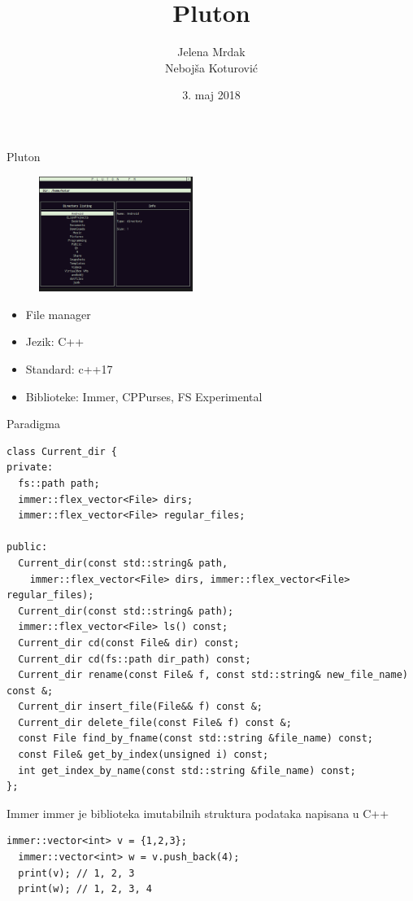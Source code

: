 \documentclass[12pt]{beamer}
\date{3. maj 2018}
\title{Pluton}
\author{Jelena Mrdak \\ Neboj\v sa Koturovi\' c}
\theoremstyle{definition}
\theoremstyle{remark}
\theoremstyle{plain}
\begin{document}
\begin{frame} 
\titlepage
\end{frame}

\begin{frame}{Pluton}
  \begin{figure}[H]
    \centering
    \includegraphics[width=5cm]{img/1.png}
  \end{figure}
  \begin{itemize}
    \item File manager 
    \item Jezik: C++
    \item Standard: c++17
    \item Biblioteke: Immer, CPPurses, FS Experimental
  \end{itemize}
\end{frame}
\usebackgroundtemplate{}


\begin{frame}[fragile]{Paradigma}
\lstset{language=C++,
    basicstyle=\tiny
}
  \begin{lstlisting}[mathescape=true]
class Current_dir {
private:
  fs::path path;
  immer::flex_vector<File> dirs;
  immer::flex_vector<File> regular_files;

public:
  Current_dir(const std::string& path, 
    immer::flex_vector<File> dirs, immer::flex_vector<File> regular_files);
  Current_dir(const std::string& path);
  immer::flex_vector<File> ls() const;
  Current_dir cd(const File& dir) const;
  Current_dir cd(fs::path dir_path) const;
  Current_dir rename(const File& f, const std::string& new_file_name) const &;
  Current_dir insert_file(File&& f) const &;
  Current_dir delete_file(const File& f) const &;
  const File find_by_fname(const std::string &file_name) const;
  const File& get_by_index(unsigned i) const;
  int get_index_by_name(const std::string &file_name) const;
};
  \end{lstlisting}
\end{frame}

\begin{frame}[fragile]{Immer}
immer je biblioteka imutabilnih struktura podataka napisana u C++
  \begin{lstlisting}[mathescape=true]
  immer::vector<int> v = {1,2,3}; 
  immer::vector<int> w = v.push_back(4); 
  print(v); // 1, 2, 3
  print(w); // 1, 2, 3, 4
  \end{lstlisting}
\end{frame}
\end{document}
